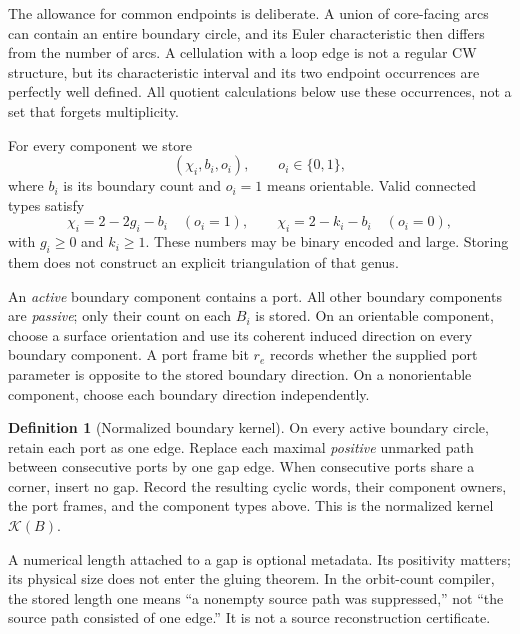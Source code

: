 \documentclass[11pt]{article}
\theoremstyle{definition}
\newtheorem{definition}[theorem]{Definition}
\theoremstyle{remark}\newtheorem{remark}[theorem]{Remark}
\newcommand{\Ker}{\mathcal K}
\begin{document}
The allowance for common endpoints is deliberate. A union of core-facing arcs can contain an entire boundary circle, and its Euler characteristic then differs from the number of arcs. A cellulation with a loop edge is not a regular CW structure, but its characteristic interval and its two endpoint occurrences are perfectly well defined. All quotient calculations below use these occurrences, not a set that forgets multiplicity.

For every component we store
\begin{equation}
       (\chi_i,b_i,o_i),\qquad o_i\in\{0,1\},
\end{equation}
where $b_i$ is its boundary count and $o_i=1$ means orientable. Valid connected types satisfy
\begin{equation}\label{eq:classification}
  \chi_i=2-2g_i-b_i\quad(o_i=1),\qquad
  \chi_i=2-k_i-b_i\quad(o_i=0),
\end{equation}
with $g_i\ge0$ and $k_i\ge1$. These numbers may be binary encoded and large. Storing them does not construct an explicit triangulation of that genus.

An \emph{active} boundary component contains a port. All other boundary components are \emph{passive}; only their count on each $B_i$ is stored. On an orientable component, choose a surface orientation and use its coherent induced direction on every boundary component. A port frame bit $r_e$ records whether the supplied port parameter is opposite to the stored boundary direction. On a nonorientable component, choose each boundary direction independently.

\begin{definition}[Normalized boundary kernel]
On every active boundary circle, retain each port as one edge. Replace each maximal \emph{positive} unmarked path between consecutive ports by one gap edge. When consecutive ports share a corner, insert no gap. Record the resulting cyclic words, their component owners, the port frames, and the component types above. This is the normalized kernel $\Ker(B)$.
\end{definition}

A numerical length attached to a gap is optional metadata. Its positivity matters; its physical size does not enter the gluing theorem. In the orbit-count compiler, the stored length one means ``a nonempty source path was suppressed,'' not ``the source path consisted of one edge.'' It is not a source reconstruction certificate.
\end{document}
